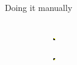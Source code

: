 \documentclass{beamer}
\begin{document}
\begin{frame}{Doing it manually}
\begin{columns}
\begin{column}{0.85\textwidth}
\begin{figure}
\begin{subfigure}[b]{0.22\textwidth}
          \includegraphics[width=\textwidth]{figures/manual_filters/edge_1.png}
      \end{subfigure}
      \begin{subfigure}[b]{0.22\textwidth}
          \includegraphics[width=\textwidth]{figures/manual_filters/edge_3.png}

\end{subfigure}
\end{figure}
\end{column}
\end{columns}
\end{frame}
\end{document}

